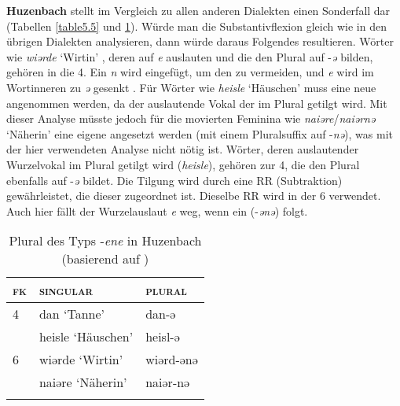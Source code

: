 \textbf{Huzenbach} stellt im Vergleich zu allen anderen Dialekten einen Sonderfall dar (Tabellen \ref{table5.5} und \ref{table5.12}). Würde man die Substantivflexion gleich wie in den übrigen Dialekten analysieren, dann würde daraus Folgendes resultieren. Wörter wie \textit{wiərde} ‘Wirtin’ \citep[97]{Baur1967}, deren  auf \textit{e} auslauten und die den Plural auf -\textit{ə} bilden, gehören in die  4. Ein \textit{n} wird eingefügt, um den  zu vermeiden, und \textit{e} wird im Wortinneren zu \textit{ə} gesenkt \citep[75-78]{Baur1967}. Für Wörter wie \textit{heisle} ‘Häuschen’ \citep[98]{Baur1967} muss eine neue  angenommen werden, da der auslautende Vokal der  im Plural getilgt wird. Mit dieser Analyse müsste jedoch für die movierten Feminina wie \textit{naiəre}/\textit{naiərnə} ‘Näherin’ \citep[97]{Baur1967} eine eigene  angesetzt werden (mit einem Pluralsuffix auf -\textit{nə}), was mit der hier verwendeten Analyse nicht nötig ist. Wörter, deren auslautender Wurzelvokal im Plural getilgt wird (\textit{heisle}), gehören zur  4, die den Plural ebenfalls auf -\textit{ə} bildet. Die Tilgung wird durch eine RR (Subtraktion) gewährleistet, die dieser  zugeordnet ist. Dieselbe RR wird in der  6 verwendet. Auch hier fällt der Wurzelauslaut \textit{e} weg, wenn ein  (-\textit{ənə}) folgt.


\begin{table}
\caption{Plural des Typs -\textit{ene} in Huzenbach (basierend auf \citealt[92-98]{Baur1967})}\label{table5.12}
\begin{tabular}{lll}
\lsptoprule
{\textsc{fk}} & {\textsc{singular}} & {\textsc{plural}}\\
\midrule
4 & dan ‘Tanne’ & dan-ə\\
& heisle ‘Häuschen’ & heisl-ə\\
\midrule
6 & wiərde ‘Wirtin’ & wiərd-ənə\\
& naiəre ‘Näherin’ & naiər-nə\\
\lspbottomrule
\end{tabular}
\end{table}


